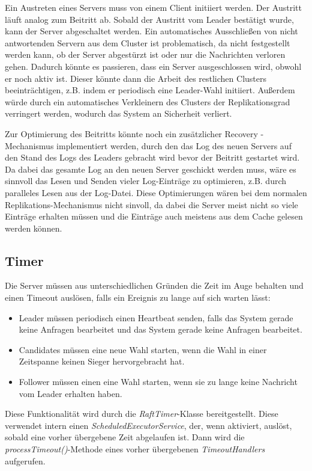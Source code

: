 Ein Austreten eines Servers muss von einem Client initiiert werden. Der Austritt läuft analog zum Beitritt ab. Sobald der Austritt vom Leader bestätigt wurde, kann der Server abgeschaltet werden. Ein automatisches Ausschließen von nicht antwortenden Servern aus dem Cluster ist problematisch, da nicht festgestellt werden kann, ob der Server abgestürzt ist oder nur die Nachrichten verloren gehen. Dadurch könnte es passieren, dass ein Server ausgeschlossen wird, obwohl er noch aktiv ist. Dieser könnte dann die Arbeit des restlichen Clusters beeinträchtigen, z.B. indem er periodisch eine Leader-Wahl initiiert. Außerdem würde durch ein automatisches Verkleinern des Clusters der Replikationsgrad verringert werden, wodurch das System an Sicherheit verliert.

Zur Optimierung des Beitritts könnte noch ein zusätzlicher \glqq Recovery \grqq-Mechanismus implementiert werden, durch den das Log des neuen Servers auf den Stand des Logs des Leaders gebracht wird bevor der Beitritt gestartet wird. Da dabei das gesamte Log an den neuen Server geschickt werden muss, wäre es sinnvoll das Lesen und Senden vieler Log-Einträge zu optimieren, z.B. durch paralleles Lesen aus der Log-Datei. Diese Optimierungen wären bei dem normalen Replikations-Mechanismus nicht sinvoll, da dabei die Server meist nicht so viele Einträge erhalten müssen und die Einträge auch meistens aus dem Cache gelesen werden können.

\subsection{Timer}

Die Server müssen aus unterschiedlichen Gründen die Zeit im Auge behalten und einen Timeout auslösen, falls ein Ereignis zu lange auf sich warten lässt:

\begin{itemize}
	\item Leader müssen periodisch einen Heartbeat senden, falls das System gerade keine Anfragen bearbeitet und das System gerade keine Anfragen bearbeitet.
	\item Candidates müssen eine neue Wahl starten, wenn die Wahl in einer Zeitspanne keinen Sieger hervorgebracht hat.
	\item Follower müssen einen eine Wahl starten, wenn sie zu lange keine Nachricht vom Leader erhalten haben.
\end{itemize}

Diese Funktionalität wird durch die \textit{RaftTimer}-Klasse bereitgestellt. Diese verwendet intern einen \textit{ScheduledExecutorService}, der, wenn aktiviert, auslöst, sobald eine vorher übergebene Zeit abgelaufen ist. Dann wird die \textit{processTimeout()}-Methode eines vorher übergebenen \textit{TimeoutHandlers} aufgerufen. 

